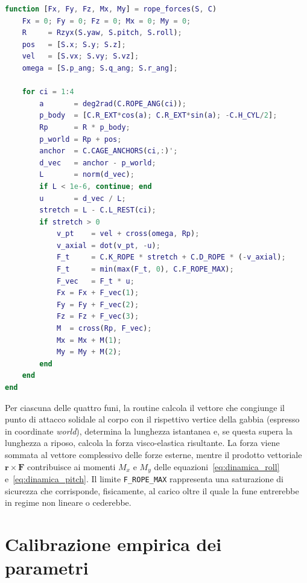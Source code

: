 \documentclass[11pt]{report}
\begin{document}
	\begin{lstlisting}[language=Matlab, caption={Calcolo delle forze e dei momenti generati dalle quattro funi di vincolo}]
function [Fx, Fy, Fz, Mx, My] = rope_forces(S, C)
    Fx = 0; Fy = 0; Fz = 0; Mx = 0; My = 0;
    R     = Rzyx(S.yaw, S.pitch, S.roll);
    pos   = [S.x; S.y; S.z];
    vel   = [S.vx; S.vy; S.vz];
    omega = [S.p_ang; S.q_ang; S.r_ang];

    for ci = 1:4
        a       = deg2rad(C.ROPE_ANG(ci));
        p_body  = [C.R_EXT*cos(a); C.R_EXT*sin(a); -C.H_CYL/2];
        Rp      = R * p_body;
        p_world = Rp + pos;
        anchor  = C.CAGE_ANCHORS(ci,:)';
        d_vec   = anchor - p_world;
        L       = norm(d_vec);
        if L < 1e-6, continue; end
        u       = d_vec / L;
        stretch = L - C.L_REST(ci);
        if stretch > 0
            v_pt    = vel + cross(omega, Rp);
            v_axial = dot(v_pt, -u);
            F_t     = C.K_ROPE * stretch + C.D_ROPE * (-v_axial);
            F_t     = min(max(F_t, 0), C.F_ROPE_MAX);
            F_vec   = F_t * u;
            Fx = Fx + F_vec(1);
            Fy = Fy + F_vec(2);
            Fz = Fz + F_vec(3);
            M  = cross(Rp, F_vec);
            Mx = Mx + M(1);
            My = My + M(2);
        end
    end
end
	\end{lstlisting}
	
	Per ciascuna delle quattro funi, la routine calcola il vettore che congiunge il punto di attacco solidale al corpo con il rispettivo vertice della gabbia (espresso in coordinate \textit{world}), determina la lunghezza istantanea e, se questa supera la lunghezza a riposo, calcola la forza visco-elastica risultante. La forza viene sommata al vettore complessivo delle forze esterne, mentre il prodotto vettoriale $\mathbf{r} \times \mathbf{F}$ contribuisce ai momenti $M_x$ e $M_y$ delle equazioni~\eqref{eq:dinamica_roll} e~\eqref{eq:dinamica_pitch}. Il limite \texttt{F\_ROPE\_MAX} rappresenta una saturazione di sicurezza che corrisponde, fisicamente, al carico oltre il quale la fune entrerebbe in regime non lineare o cederebbe.
	
	\section{Calibrazione empirica dei parametri}
	\label{sec:calibrazione_param}
	
\end{document}

